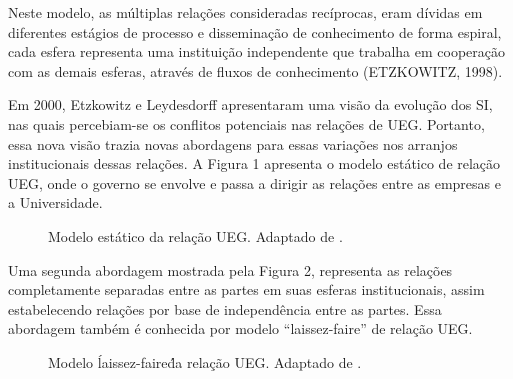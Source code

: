 Neste modelo, as múltiplas relações consideradas recíprocas, eram dívidas em diferentes estágios de processo e disseminação de conhecimento de forma espiral, cada esfera representa uma instituição independente que trabalha em cooperação com as demais esferas, através de fluxos de conhecimento (ETZKOWITZ, 1998).

Em 2000, Etzkowitz e Leydesdorff apresentaram uma visão da evolução dos SI, nas quais percebiam-se os conflitos potenciais nas relações de UEG. Portanto, essa nova visão trazia novas abordagens para essas variações nos arranjos institucionais dessas relações. A Figura 1 apresenta o modelo estático de relação UEG, onde o governo se envolve e passa a dirigir as relações entre as empresas e a Universidade.


\begin{figure}[ht]
  \centering
  \caption{Modelo estático da relação UEG. Adaptado de \cite{etzkowitz2003innovation}.}
  \label{crescimento_odf}
\end{figure}

Uma segunda abordagem mostrada pela Figura 2, representa as relações completamente separadas entre as partes em suas esferas institucionais, assim estabelecendo relações por base de independência entre as partes. Essa abordagem também é conhecida por modelo “laissez-faire” de relação UEG.


\begin{figure}[ht]
  \centering
  \caption{Modelo \'laissez-faire\' da relação UEG. Adaptado de \cite{etzkowitz2003innovation}.}
  \label{crescimento_odf}
\end{figure}

